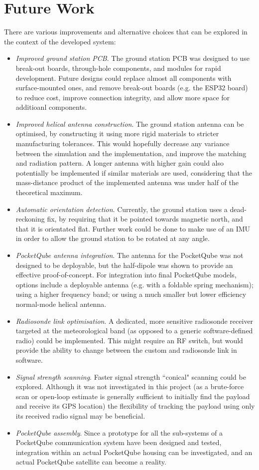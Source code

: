 \section{Future Work}\label{sec:future_work}

There are various improvements and alternative choices that can be explored in the context of the developed system:
\begin{itemize}
    \item \textit{Improved ground station PCB}. The ground station PCB was designed to use break-out boards, through-hole components, and modules for rapid development. Future designs could replace almost all components with surface-mounted ones, and remove break-out boards (e.g. the ESP32 board) to reduce cost, improve connection integrity, and allow more space for additioanl components.
    \item \textit{Improved helical antenna construction}. The ground station antenna can be optimised, by constructing it using more rigid materials to stricter manufacturing tolerances. This would hopefully decrease any variance between the simulation and the implementation, and improve the matching and radiation pattern. A longer antenna with higher gain could also potentially be implemented if similar materials are used, considering that the mass-distance product of the implemented antenna was under half of the theoretical maximum.
    \item \textit{Automatic orientation detection}. Currently, the ground station uses a dead-reckoning fix, by requiring that it be pointed towards magnetic north, and that it is orientated flat. Further work could be done to make use of an IMU in order to allow the ground station to be rotated at any angle.
    \item \textit{PocketQube antenna integration}. The antenna for the PocketQube was not designed to be deployable, but the half-dipole was shown to provide an effective proof-of-concept. For integration into final PocketQube models, options include a deployable antenna (e.g. with a foldable spring mechanism); using a higher frequency band; or using a much smaller but lower efficiency normal-mode helical antenna.
    \item \textit{Radiosonde link optimisation}. A dedicated, more sensitive radiosonde receiver targeted at the meteorological band (as opposed to a generic software-defined radio) could be implemented. This might require an RF switch, but would provide the ability to change between the custom and radiosonde link in software.
    \item \textit{Signal strength scanning}. Faster signal strength ``conical" scanning could be explored. Although it was not investigated in this project (as a brute-force scan or open-loop estimate is generally sufficient to initially find the payload and receive its GPS location) the flexibility of tracking the payload using only its received radio signal may be beneficial.
    \item \textit{PocketQube assembly}. Since a prototype for all the sub-systems of a PocketQube communication system have been designed and tested, integration within an actual PocketQube housing can be investigated, and an actual PocketQube satellite can become a reality.
\end{itemize}